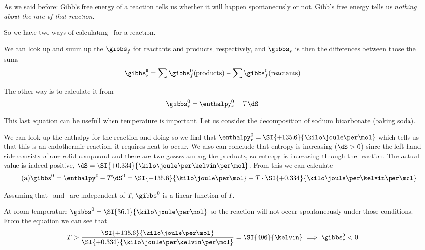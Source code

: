 \documentclass[../mit-general-chemistry.tex]{subfiles}
\begin{document}
As we said before: Gibb's free energy of a reaction tells us whether
it will happen spontaneously or not. Gibb's free energy tells us
{\em nothing about the rate of that reaction}.






So we have two ways of calculating \gibbs\ for a reaction.

We can look up and suum up the $\gibbs_f$ for reactants and products,
respectively, and $\gibbs_r$ is then the differences between those
the sums
\begin{equation*}
  \gibbs^0_r = \sum\gibbs^0_f(\text{products}) - \sum\gibbs^0_f(\text{reactants})
\end{equation*}


The other way is to calculate it from
\begin{equation*}
  \gibbs^0_r = \enthalpy^0_r - T\dS
\end{equation*}

This last equation can be usefull when temperature is important. Let
us consider the decomposition of sodium bicarbonate (baking soda).


We can look up the enthalpy for the reaction and doing so we find that
$\enthalpy_r^0 = \SI{+135.6}{\kilo\joule\per\mol}$ which tells us that
this is an endothermic reaction, it requires heat to occur. We also
can conclude that entropy is increasing ($\dS > 0$) since the left
hand side consists of one solid compound and there are two gasses
among the products, so entropy is increasing through the reaction. The
actual value is indeed positive, $\dS =
\SI{+0.334}{\kilo\joule\per\kelvin\per\mol}$. From this we can
calculate
\begin{equation*}\tag{a}
  \gibbs^0 = \enthalpy^0 - T \dS^0
  = \SI{+135.6}{\kilo\joule\per\mol}
  - T\cdot \SI{+0.334}{\kilo\joule\per\kelvin\per\mol}
\end{equation*}



Assuming that \dS\ and \enthalpy\ are independent of $T$,
$\gibbs^0$ is a linear function of $T$.

At room temperature $\gibbs^0 = \SI{36.1}{\kilo\joule\per\mol}$ so the
reaction will not occur spontaneously under those conditions. From the
equation we can see that
\begin{equation*}
  T > \frac{\SI{+135.6}{\kilo\joule\per\mol}}{\SI{+0.334}{\kilo\joule\per\kelvin\per\mol}} = 
  \SI{406}{\kelvin}
  \implies
  \gibbs^0_r < 0
\end{equation*}
\end{document}
